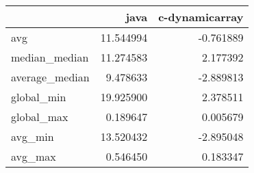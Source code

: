 \begin{tabular}{lrr}
\toprule
{} &       java &  c-dynamicarray \\
\midrule
avg            &  11.544994 &       -0.761889 \\
median\_median  &  11.274583 &        2.177392 \\
average\_median &   9.478633 &       -2.889813 \\
global\_min     &  19.925900 &        2.378511 \\
global\_max     &   0.189647 &        0.005679 \\
avg\_min        &  13.520432 &       -2.895048 \\
avg\_max        &   0.546450 &        0.183347 \\
\bottomrule
\end{tabular}
